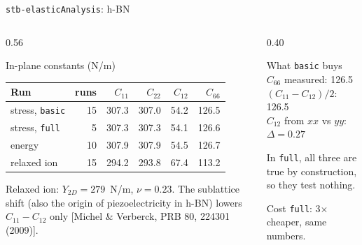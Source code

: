 \documentclass[8pt]{beamer}
\begin{document}
\begin{frame}{\texttt{stb-elasticAnalysis}: h-BN}
	\begin{columns}[T]
		\begin{column}{0.56\textwidth}
			\begin{block}{In-plane constants (N/m)}
				\centering\scriptsize
				\setlength{\tabcolsep}{4pt}
				\begin{tabular}{lrrrrr}
					\toprule
					Run & runs & $C_{11}$ & $C_{22}$ & $C_{12}$ & $C_{66}$ \\
					\midrule
					stress, \texttt{basic} & 15 & 307.3 & 307.0 & 54.2 & 126.5 \\
					stress, \texttt{full} & 5 & 307.3 & 307.3 & 54.1 & 126.6 \\
					energy & 10 & 307.9 & 307.9 & 54.5 & 126.7 \\
					\midrule
					relaxed ion & 15 & 294.2 & 293.8 & 67.4 & 113.2 \\
					\bottomrule
				\end{tabular}
			\end{block}
			{\scriptsize Relaxed ion: $Y_{2D} = 279$~N/m, $\nu = 0.23$.
			The sublattice shift (also the origin of piezoelectricity in h-BN)
			lowers $C_{11}-C_{12}$ only [Michel \& Verberck, PRB 80, 224301 (2009)].}
		\end{column}
		\begin{column}{0.40\textwidth}
			\begin{block}{What \texttt{basic} buys}
				\small
				$C_{66}$ measured: 126.5\\
				$(C_{11}-C_{12})/2$: 126.5\\
				$C_{12}$ from $xx$ vs $yy$: $\Delta = 0.27$
				\par\vspace{0.1cm}
				{\scriptsize In \texttt{full}, all three are true by construction,
				so they test nothing.}
			\end{block}
			\begin{alertblock}{Cost}
				\texttt{full}: 3$\times$ cheaper, same numbers.
			\end{alertblock}
		\end{column}
	\end{columns}
\end{frame}
\end{document}
